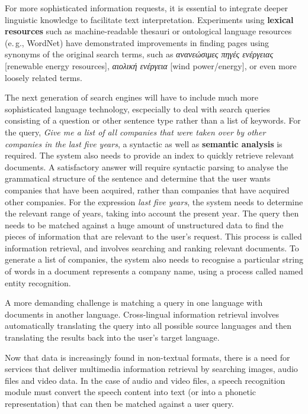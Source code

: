 \documentclass[]{../../metanetpaper}
\begin{document}
\begin{multicols}{2}
For more sophisticated information requests, it is essential to integrate deeper linguistic knowledge to facilitate text interpretation. Experiments using \textbf{lexical resources} such as machine-readable thesauri or ontological language resources (e.\,g., WordNet) have demonstrated improvements in finding pages using synonyms of the original search terms, such as \textit{ανανεώσιμες πηγές ενέργειας} {[}renewable energy resources{]}, \textit{αιολική ενέργεια} {[}wind power/energy{]}, or even more loosely related terms.


The next generation of search engines will have to include much more sophisticated language technology, escpecially to deal with search queries consisting of a question or other sentence type rather than a list of keywords. For the query, \textit{Give me a list of all companies that were taken over by other companies in the last five years}, a syntactic as well as \textbf{semantic analysis} is required. The system also needs to provide an index to quickly retrieve relevant documents. A satisfactory answer will require syntactic parsing to analyse the grammatical structure of the sentence and determine that the user wants companies that have been acquired, rather than companies that have acquired other companies. For the expression \textit{last five years}, the system needs to determine the relevant range of years, taking into account the present year. The query then needs to be matched against a huge amount of unstructured data to find the pieces of information that are relevant to the user’s request. This process is called information retrieval, and involves searching and ranking relevant documents. To generate a list of companies, the system also needs to recognise a particular string of words in a document represents a company name, using a process called named entity recognition.

A more demanding challenge is matching a query in one language with documents in another language. Cross-lingual information retrieval involves automatically translating the query into all possible source languages and then translating the results back into the user's target language.

Now that data is increasingly found in non-textual formats, there is a need for services that deliver multimedia information retrieval by searching images, audio files and video data. In the case of audio and video files, a speech recognition module must convert the speech content into text (or into a phonetic representation) that can then be matched against a user query.


\end{multicols}
\end{document}
